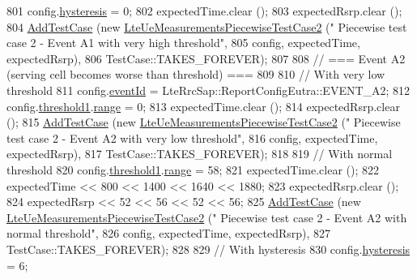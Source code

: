 \begin{DoxyCode}
801   config.\hyperlink{structns3_1_1LteRrcSap_1_1ReportConfigEutra_a1fb9169ea261ba20af6a0c18fcc04fa9}{hysteresis} = 0;
802   expectedTime.clear ();
803   expectedRsrp.clear ();
804   \hyperlink{classns3_1_1TestCase_a3718088e3eefd5d6454569d2e0ddd835}{AddTestCase} (\textcolor{keyword}{new} \hyperlink{classLteUeMeasurementsPiecewiseTestCase2}{LteUeMeasurementsPiecewiseTestCase2} (\textcolor{stringliteral}{"
      Piecewise test case 2 - Event A1 with very high threshold"},
805                                                         config, expectedTime, expectedRsrp),
806                TestCase::TAKES\_FOREVER);
807 
808   \textcolor{comment}{// === Event A2 (serving cell becomes worse than threshold) ===}
809 
810   \textcolor{comment}{// With very low threshold}
811   config.\hyperlink{structns3_1_1LteRrcSap_1_1ReportConfigEutra_a1fbe931cc9584614d20f4affbce70d8a}{eventId} = LteRrcSap::ReportConfigEutra::EVENT\_A2;
812   config.\hyperlink{structns3_1_1LteRrcSap_1_1ReportConfigEutra_a8f36bc45a61054920e490be8bf33b4ca}{threshold1}.\hyperlink{structns3_1_1LteRrcSap_1_1ThresholdEutra_abd4950e20a1a93727535e8364bf85b03}{range} = 0;
813   expectedTime.clear ();
814   expectedRsrp.clear ();
815   \hyperlink{classns3_1_1TestCase_a3718088e3eefd5d6454569d2e0ddd835}{AddTestCase} (\textcolor{keyword}{new} \hyperlink{classLteUeMeasurementsPiecewiseTestCase2}{LteUeMeasurementsPiecewiseTestCase2} (\textcolor{stringliteral}{"
      Piecewise test case 2 - Event A2 with very low threshold"},
816                                                         config, expectedTime, expectedRsrp),
817                TestCase::TAKES\_FOREVER);
818 
819   \textcolor{comment}{// With normal threshold}
820   config.\hyperlink{structns3_1_1LteRrcSap_1_1ReportConfigEutra_a8f36bc45a61054920e490be8bf33b4ca}{threshold1}.\hyperlink{structns3_1_1LteRrcSap_1_1ThresholdEutra_abd4950e20a1a93727535e8364bf85b03}{range} = 58;
821   expectedTime.clear ();
822   expectedTime << 800 << 1400 << 1640 << 1880;
823   expectedRsrp.clear ();
824   expectedRsrp << 52 << 56 << 52 << 56;
825   \hyperlink{classns3_1_1TestCase_a3718088e3eefd5d6454569d2e0ddd835}{AddTestCase} (\textcolor{keyword}{new} \hyperlink{classLteUeMeasurementsPiecewiseTestCase2}{LteUeMeasurementsPiecewiseTestCase2} (\textcolor{stringliteral}{"
      Piecewise test case 2 - Event A2 with normal threshold"},
826                                                         config, expectedTime, expectedRsrp),
827                TestCase::TAKES\_FOREVER);
828 
829   \textcolor{comment}{// With hysteresis}
830   config.\hyperlink{structns3_1_1LteRrcSap_1_1ReportConfigEutra_a1fb9169ea261ba20af6a0c18fcc04fa9}{hysteresis} = 6;

\end{DoxyCode}
